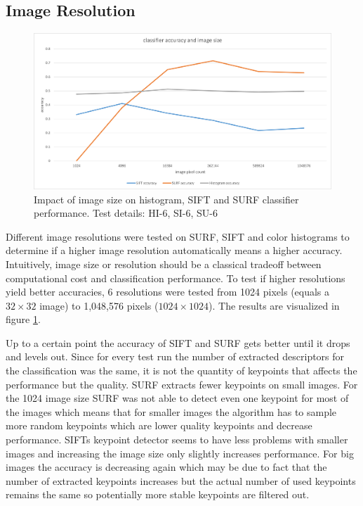 	\subsection{Image Resolution}
	\begin{figure}[htb]
		\centering
		\includegraphics[scale=0.6]{figures/results_resolution}		
		\caption{Impact of image size on histogram, SIFT and SURF classifier performance. Test details: HI-6, SI-6, SU-6}
		\label{fig:resultsResolution}
	\end{figure}
	Different image resolutions were tested on SURF, SIFT and color histograms to determine if a higher image resolution automatically means a higher accuracy. Intuitively, image size or resolution should be a classical tradeoff between computational cost and classification performance. To test if higher resolutions yield better accuracies, 6 resolutions were tested from 1024 pixels {(equals a $32 \times 32$ image)} to 1,048,576 pixels {($1024 \times 1024$)}. The results are visualized in figure \ref{fig:resultsResolution}.  
	
	Up to a certain point the accuracy of SIFT and SURF gets better until it drops and levels out. Since for every test run the number of extracted descriptors for the classification was the same, it is not the quantity of keypoints that affects the performance but the quality. SURF extracts fewer keypoints on small images. For the 1024 image size SURF was not able to detect even one keypoint for most of the images which means that for smaller images the algorithm has to sample more random keypoints which are lower quality keypoints and decrease performance. SIFTs keypoint detector seems to have less problems with smaller images and increasing the image size only slightly increases performance. For big images the accuracy is decreasing again which may be due to fact that the number of extracted keypoints increases but the actual number of used keypoints remains the same so potentially more stable keypoints are filtered out.
	
